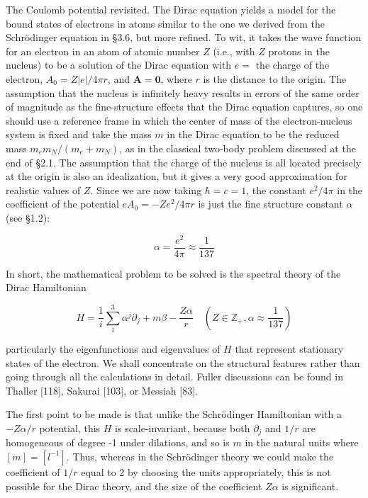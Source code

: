 \documentclass[10pt, letterpaper]{article}
\begin{document}
The Coulomb potential revisited. The Dirac equation yields a model for the bound states of electrons in atoms similar to the one we derived from the Schrödinger equation in §3.6, but more refined. To wit, it takes the wave function for an electron in an atom of atomic number $Z$ (i.e., with $Z$ protons in the nucleus) to be a solution of the Dirac equation with $e=$ the charge of the electron, $A_{0}=Z|e| / 4 \pi r$, and $\mathbf{A}=\mathbf{0}$, where $r$ is the distance to the origin. The assumption that the nucleus is infinitely heavy results in errors of the same order of magnitude as the fine-structure effects that the Dirac equation captures, so one should use a reference frame in which the center of mass of the electron-nucleus system is fixed and take the mass $m$ in the Dirac equation to be the reduced mass $m_{e} m_{N} /\left(m_{e}+m_{N}\right)$, as in the classical two-body problem discussed at the end of §2.1. The assumption that the charge of the nucleus is all located precisely at the origin is also an idealization, but it gives a very good approximation for realistic values of $Z$. Since we are now taking $\hbar=c=1$, the constant $e^{2} / 4 \pi$ in the coefficient of the potential $e A_{0}=-Z e^{2} / 4 \pi r$ is just the fine structure constant $\alpha$ (see §1.2):

$$
\alpha=\frac{e^{2}}{4 \pi} \approx \frac{1}{137}
$$

In short, the mathematical problem to be solved is the spectral theory of the Dirac Hamiltonian

$$
H=\frac{1}{i} \sum_{1}^{3} \alpha^{j} \partial_{j}+m \beta-\frac{Z \alpha}{r} \quad\left(Z \in \mathbb{Z}_{+}, \alpha \approx \frac{1}{137}\right)
$$

particularly the eigenfunctions and eigenvalues of $H$ that represent stationary states of the electron. We shall concentrate on the structural features rather than going through all the calculations in detail. Fuller discussions can be found in Thaller [118], Sakurai [103], or Messiah [83].

The first point to be made is that unlike the Schrödinger Hamiltonian with a $-Z \alpha / r$ potential, this $H$ is scale-invariant, because both $\partial_{j}$ and $1 / r$ are homogeneous of degree -1 under dilations, and so is $m$ in the natural units where $[m]=\left[l^{-1}\right]$. Thus, whereas in the Schrödinger theory we could make the coefficient of $1 / r$ equal to 2 by choosing the units appropriately, this is not possible for the Dirac theory, and the size of the coefficient $Z \alpha$ is significant.
\end{document}
